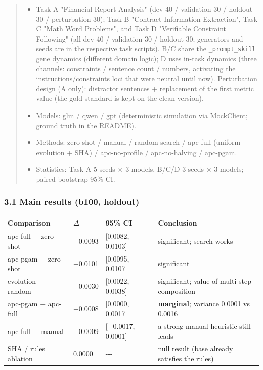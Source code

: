 \begin{quote}
\begin{itemize}
\tightlist
\item
  Task A "Financial Report Analysis" (dev 40 / validation 30 / holdout 30 / perturbation 30); Task B "Contract Information Extraction", Task C "Math Word Problems", and Task D "Verifiable Constraint Following" (all dev 40 / validation 30 / holdout 30; generators and seeds are in the respective task scripts). B/C share the \texttt{\_prompt\_skill} gene dynamics (different domain logic); D uses in-task dynamics (three channels: constraints / sentence count / numbers, activating the instructions/constraints loci that were neutral until now). Perturbation design (A only): distractor sentences + replacement of the first metric value (the gold standard is kept on the clean version).
\item
  Models: glm / qwen / gpt (deterministic simulation via MockClient; ground truth in the README).
\item
  Methods: zero-shot / manual / random-search / apc-full (uniform evolution + SHA) / apc-no-profile / apc-no-halving / apc-pgam.
\item
  Statistics: Task A 5 seeds \(\times\) 3 models, B/C/D 3 seeds \(\times\) 3 models; paired bootstrap 95\% CI.
\end{itemize}
\end{quote}

\subsubsection{3.1 Main results (b100, holdout)}\label{31-main-results-b100-holdout}

\begin{longtable}[]{@{}llll@{}}
\toprule\noalign{}
Comparison & \(\Delta\) & 95\% CI & Conclusion \\
\midrule\noalign{}
\endhead
\bottomrule\noalign{}
\endlastfoot
apc-full \(-\) zero-shot & +0.0093 & {[}0.0082, 0.0103{]} & significant; search works \\
apc-pgam \(-\) zero-shot & +0.0101 & {[}0.0095, 0.0107{]} & significant \\
evolution \(-\) random & +0.0030 & {[}0.0022, 0.0038{]} & significant; value of multi-step composition \\
apc-pgam \(-\) apc-full & +0.0008 & {[}0.0000, 0.0017{]} & \textbf{marginal}; variance 0.0001 vs 0.0016 \\
apc-full \(-\) manual & \(-\)0.0009 & {[}\(-\)0.0017, \(-\)0.0001{]} & a strong manual heuristic still leads \\
SHA / rules ablation & 0.0000 & -\/-\/- & null result (base already satisfies the rules) \\
\end{longtable}


